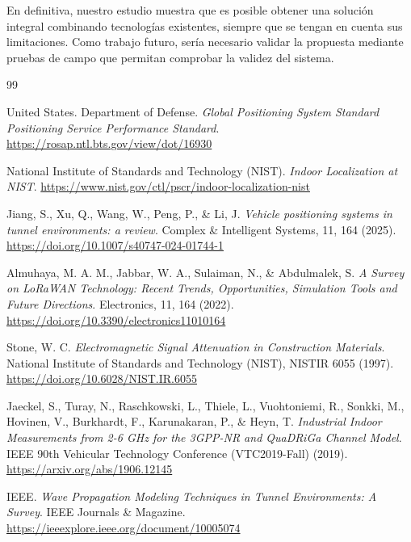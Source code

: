 \documentclass[11pt,a4paper]{article}
\begin{document}
En definitiva, nuestro estudio muestra que es posible obtener una solución integral combinando tecnologías existentes, siempre que se tengan en cuenta sus limitaciones. Como trabajo futuro, sería necesario validar la propuesta mediante pruebas de campo que permitan comprobar la validez del sistema.

\newpage
{}
{}
\renewcommand{\refname}{Bibliografía}
\begin{thebibliography}{99}
    \setlength{\itemsep}{2pt}

     United States. Department of Defense. \emph{Global Positioning System Standard Positioning Service Performance Standard}. \url{https://rosap.ntl.bts.gov/view/dot/16930}

     National Institute of Standards and Technology (NIST). \emph{Indoor Localization at NIST}. \url{https://www.nist.gov/ctl/pscr/indoor-localization-nist}

     Jiang, S., Xu, Q., Wang, W., Peng, P., \& Li, J. \emph{Vehicle positioning systems in tunnel environments: a review}. Complex \& Intelligent Systems, 11, 164 (2025). \url{https://doi.org/10.1007/s40747-024-01744-1}

     Almuhaya, M. A. M., Jabbar, W. A., Sulaiman, N., \& Abdulmalek, S. \emph{A Survey on LoRaWAN Technology: Recent Trends, Opportunities, Simulation Tools and Future Directions}. Electronics, 11, 164 (2022). \url{https://doi.org/10.3390/electronics11010164}

     Stone, W. C. \emph{Electromagnetic Signal Attenuation in Construction Materials}. National Institute of Standards and Technology (NIST), NISTIR 6055 (1997). \url{https://doi.org/10.6028/NIST.IR.6055}

     Jaeckel, S., Turay, N., Raschkowski, L., Thiele, L., Vuohtoniemi, R., Sonkki, M., Hovinen, V., Burkhardt, F., Karunakaran, P., \& Heyn, T. \emph{Industrial Indoor Measurements from 2-6 GHz for the 3GPP-NR and QuaDRiGa Channel Model}. IEEE 90th Vehicular Technology Conference (VTC2019-Fall) (2019). \url{https://arxiv.org/abs/1906.12145}

     IEEE. \emph{Wave Propagation Modeling Techniques in Tunnel Environments: A Survey}. IEEE Journals \& Magazine. \url{https://ieeexplore.ieee.org/document/10005074}


\end{thebibliography}
\end{document}
